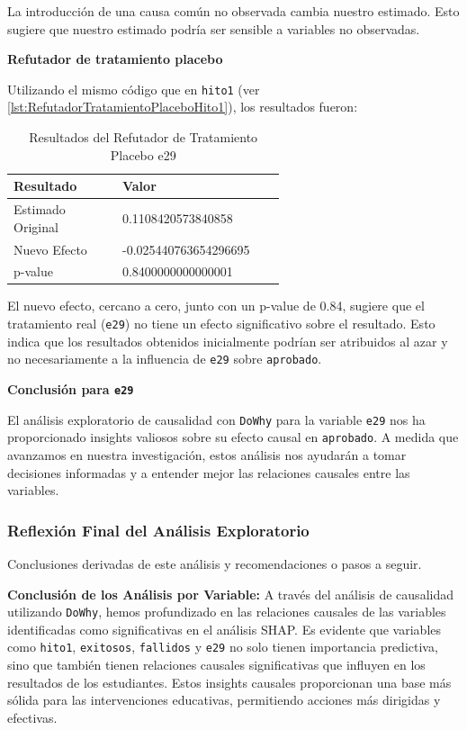 La introducción de una causa común no observada cambia nuestro estimado. Esto sugiere que nuestro estimado podría ser sensible a variables no observadas.

\textbf{Refutador de tratamiento placebo}

Utilizando el mismo código que en \texttt{hito1} (ver \ref{lst:RefutadorTratamientoPlaceboHito1}), los resultados fueron:

\begin{table}[H]
    \centering
    \begin{tabular}{lp{0.6\linewidth}}
        \toprule
        \textbf{Resultado} & \textbf{Valor} \\
        \midrule
        Estimado Original & 0.1108420573840858 \\
        Nuevo Efecto & -0.025440763654296695 \\
        p-value & 0.8400000000000001 \\
        \bottomrule
    \end{tabular}
    \caption{Resultados del Refutador de Tratamiento Placebo e29}
    \label{tab:refutador_placebo_29}
\end{table}

El nuevo efecto, cercano a cero, junto con un p-value de 0.84, sugiere que el tratamiento real (\texttt{e29}) no tiene un efecto significativo sobre el resultado. Esto indica que los resultados obtenidos inicialmente podrían ser atribuidos al azar y no necesariamente a la influencia de \texttt{e29} sobre \texttt{aprobado}.

\textbf{Conclusión para \texttt{e29}}

El análisis exploratorio de causalidad con \texttt{DoWhy} para la variable \texttt{e29} nos ha proporcionado insights valiosos sobre su efecto causal en \texttt{aprobado}. A medida que avanzamos en nuestra investigación, estos análisis nos ayudarán a tomar decisiones informadas y a entender mejor las relaciones causales entre las variables.

\subsubsection{Reflexión Final del Análisis Exploratorio} Conclusiones derivadas de este análisis y recomendaciones o pasos a seguir.


\textbf{Conclusión de los Análisis por Variable:} A través del análisis de causalidad utilizando \texttt{DoWhy}, hemos profundizado en las relaciones causales de las variables identificadas como significativas en el análisis SHAP. Es evidente que variables como \texttt{hito1}, \texttt{exitosos}, \texttt{fallidos} y \texttt{e29} no solo tienen importancia predictiva, sino que también tienen relaciones causales significativas que influyen en los resultados de los estudiantes. Estos insights causales proporcionan una base más sólida para las intervenciones educativas, permitiendo acciones más dirigidas y efectivas.


